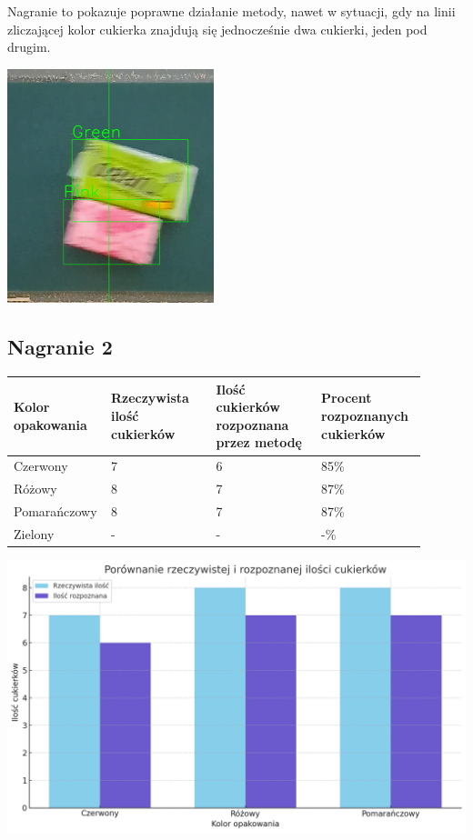 \documentclass{article}
\begin{document}
Nagranie to pokazuje poprawne działanie metody, nawet w sytuacji, gdy na linii zliczającej kolor cukierka znajdują się jednocześnie dwa cukierki, jeden pod drugim.

\begin{center}
\includegraphics[width=6cm]{badanie.png}
\end{center}

\subsection{Nagranie 2}


\begin{center}
\begin{tabular}{|p{0.15\linewidth}|p{0.25\linewidth}|p{0.25\linewidth}|p{0.25\linewidth}|}
 \hline
 Kolor opakowania & Rzeczywista ilość cukierków & Ilość cukierków rozpoznana przez metodę & Procent rozpoznanych cukierków \\
 \hline
 Czerwony & 7 & 6 & 85\% \\
 \hline
 Różowy & 8 & 7 & 87\% \\
 \hline
 Pomarańczowy & 8 & 7 & 87\% \\
 \hline
 Zielony & - & - & -\% \\
 \hline
\end{tabular}
\end{center}

\begin{center}
\includegraphics[width=\linewidth]{wykres2.png}
\end{center}
\end{document}
